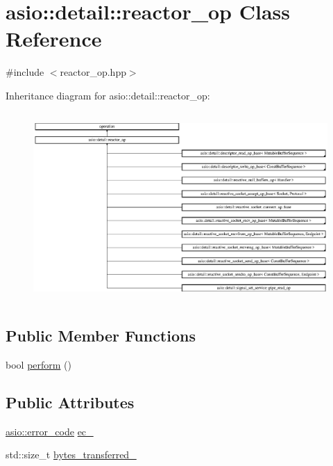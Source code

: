 \hypertarget{classasio_1_1detail_1_1reactor__op}{}\section{asio\+:\+:detail\+:\+:reactor\+\_\+op Class Reference}
\label{classasio_1_1detail_1_1reactor__op}


{\ttfamily \#include $<$reactor\+\_\+op.\+hpp$>$}

Inheritance diagram for asio\+:\+:detail\+:\+:reactor\+\_\+op\+:\begin{figure}[H]
\begin{center}
\leavevmode
\includegraphics[height=7.207921cm]{classasio_1_1detail_1_1reactor__op}
\end{center}
\end{figure}
\subsection*{Public Member Functions}
\begin{DoxyCompactItemize}
\item 
bool \hyperlink{classasio_1_1detail_1_1reactor__op_af603492bc02c6a898a13af121542f74d}{perform} ()
\end{DoxyCompactItemize}
\subsection*{Public Attributes}
\begin{DoxyCompactItemize}
\item 
\hyperlink{classasio_1_1error__code}{asio\+::error\+\_\+code} \hyperlink{classasio_1_1detail_1_1reactor__op_a1d4d635e42b05dd18f11b17c99ec7ed4}{ec\+\_\+}
\item 
std\+::size\+\_\+t \hyperlink{classasio_1_1detail_1_1reactor__op_a721fcf0d5ad569136e6f7a384b1311fc}{bytes\+\_\+transferred\+\_\+}
\end{DoxyCompactItemize}
